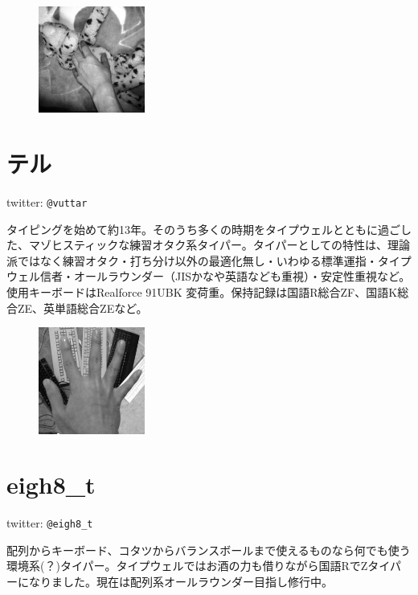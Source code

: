 \clearpage

\begin{figure}
\includegraphics[width=3.5cm,clip]{res_author/vuttar_temoto.eps}
\end{figure}
\section*{テル}
twitter: \verb|@vuttar|

タイピングを始めて約13年。そのうち多くの時期をタイプウェルとともに過ごした、マゾヒスティックな練習オタク系タイパー。タイパーとしての特性は、理論派ではなく練習オタク・打ち分け以外の最適化無し・いわゆる標準運指・タイプウェル信者・オールラウンダー（JISかなや英語なども重視）・安定性重視など。使用キーボードはRealforce 91UBK 変荷重。保持記録は国語R総合ZF、国語K総合ZE、英単語総合ZEなど。

\vspace{5mm}

\begin{figure}
\includegraphics[width=3.5cm,clip]{res_author/eigh8_t_temoto.eps}
\end{figure}
\section*{eigh8\_t}
twitter: \verb|@eigh8_t|

配列からキーボード、コタツからバランスボールまで使えるものなら何でも使う環境系(？)タイパー。タイプウェルではお酒の力も借りながら国語RでZタイパーになりました。現在は配列系オールラウンダー目指し修行中。
 \\
 \\

\vspace{5mm}

